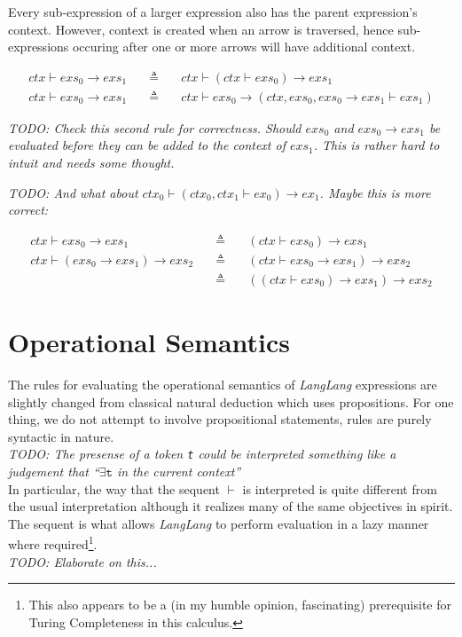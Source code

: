 \documentclass[a4paper,11pt]{article}
\begin{document}
Every sub-expression of a larger expression also has the parent expression's context.
However, context is created when an arrow is traversed, hence sub-expressions occuring after one or more arrows will have additional context.

\begin{eqnarray*}
ctx \vdash exs_0 \rightarrow exs_1 \quad&\triangleq&\quad ctx \vdash (ctx \vdash exs_0) \rightarrow exs_1 \\
ctx \vdash exs_0 \rightarrow exs_1 \quad&\triangleq&\quad ctx \vdash exs_0 \rightarrow (ctx,exs_0,exs_0 \rightarrow exs_1 \vdash exs_1)
\end{eqnarray*}

\emph{TODO: Check this second rule for correctness. 
Should $exs_0$ and $exs_0 \rightarrow exs_1$ be evaluated before they can be added to the context of $exs_1$.
This is rather hard to intuit and needs some thought.}

\emph{TODO: And what about $ctx_0 \vdash (ctx_0,ctx_1 \vdash ex_0) \rightarrow ex_1$. Maybe this is more correct:}

\begin{eqnarray*}
ctx \vdash exs_0 \rightarrow exs_1 \quad&\triangleq&\quad (ctx \vdash exs_0) \rightarrow exs_1 \\
ctx \vdash (exs_0 \rightarrow exs_1) \rightarrow exs_2 \quad&\triangleq&\quad (ctx \vdash exs_0 \rightarrow exs_1) \rightarrow exs_2 \\
                                                            &\triangleq&\quad ((ctx \vdash exs_0) \rightarrow exs_1) \rightarrow exs_2
\end{eqnarray*}

\section{Operational Semantics}
The rules for evaluating the operational semantics of \textsl{LangLang} expressions are slightly changed from classical natural deduction which uses propositions.
For one thing, we do not attempt to involve propositional statements, rules are purely syntactic in nature.\\
\emph{TODO: The presense of a token \texttt{t} could be interpreted something like a judgement that ``$\exists\mathtt{t}$ in the current context''}\\

In particular, the way that the sequent $\vdash$ is interpreted is quite different from the usual interpretation although it realizes many of the same objectives in spirit.
The sequent is what allows \textsl{LangLang} to perform evaluation in a lazy manner where required\footnote{This also appears to be a (in my humble opinion, fascinating) prerequisite for Turing Completeness in this calculus.}.\\
\emph{TODO: Elaborate on this...}
\end{document}
